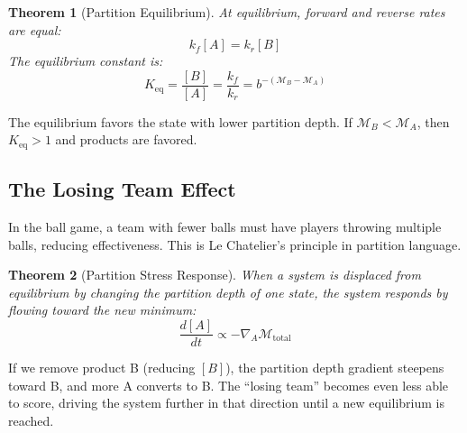 \documentclass[twocolumn,10pt,a4paper]{article}
\newtheorem{theorem}{Theorem}[section]
\theoremstyle{definition}
\theoremstyle{remark}
\newcommand{\Depth}{\mathcal{M}}
\begin{document}
\begin{theorem}[Partition Equilibrium]
\label{thm:equilibrium}
At equilibrium, forward and reverse rates are equal:
\begin{equation}
    k_f [A] = k_r [B]
\end{equation}
The equilibrium constant is:
\begin{equation}
    K_{\mathrm{eq}} = \frac{[B]}{[A]} = \frac{k_f}{k_r} = b^{-(\Depth_B - \Depth_A)}
\end{equation}
\end{theorem}

The equilibrium favors the state with lower partition depth. If $\Depth_B < \Depth_A$, then $K_{\mathrm{eq}} > 1$ and products are favored.

\subsection{The Losing Team Effect}

In the ball game, a team with fewer balls must have players throwing multiple balls, reducing effectiveness. This is Le Chatelier's principle in partition language.

\begin{theorem}[Partition Stress Response]
\label{thm:lechatelier}
When a system is displaced from equilibrium by changing the partition depth of one state, the system responds by flowing toward the new minimum:
\begin{equation}
    \frac{d[A]}{dt} \propto -\nabla_A \Depth_{\mathrm{total}}
\end{equation}
\end{theorem}

If we remove product B (reducing $[B]$), the partition depth gradient steepens toward B, and more A converts to B. The ``losing team'' becomes even less able to score, driving the system further in that direction until a new equilibrium is reached.
\end{document}

